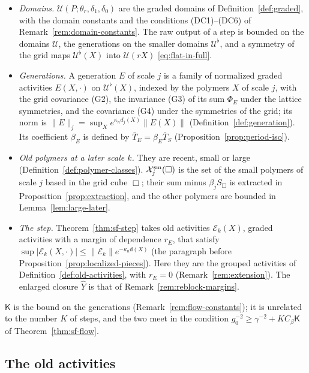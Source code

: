 \begin{readingbox}
\begin{itemize}
\item \emph{Domains.} $\mathcal U(P;\theta_r,\delta_1,\delta_0)$ are the graded domains of Definition~\ref{def:graded}, with the domain constants and the conditions (DC1)--(DC6) of Remark~\ref{rem:domain-constants}. The raw output of a step is bounded on the domains $\mathcal U$, the generations on the smaller domains $\mathcal U^\flat$, and a symmetry of the grid maps $\mathcal U^\flat(X)$ into $\mathcal U(rX)$ \eqref{eq:flat-in-full}.
\item \emph{Generations.} A generation $E$ of scale $j$ is a family of normalized graded activities $E(X,\cdot)$ on $\mathcal U^\flat(X)$, indexed by the polymers $X$ of scale $j$, with the grid covariance (G2), the invariance (G3) of its sum $\Phi_E$ under the lattice symmetries, and the covariance (G4) under the symmetries of the grid; its norm is $\|E\|_j=\sup_Xe^{\kappa_nd_j(X)}\|E(X)\|$ (Definition~\ref{def:generation}). Its coefficient $\beta_E$ is defined by $\bar T_E=\beta_E\bar T_S$ (Proposition~\ref{prop:period-iso}).
\item \emph{Old polymers at a later scale $k$.} They are recent, small or large (Definition~\ref{def:polymer-classes}). $\mathcal X^{\rm sm}_j(\Box)$ is the set of the small polymers of scale $j$ based in the grid cube $\Box$; their sum minus $\beta_jS_\Box$ is extracted in Proposition~\ref{prop:extraction}, and the other polymers are bounded in Lemma~\ref{lem:large-later}.
\item \emph{The step.} Theorem~\ref{thm:sf-step} takes old activities $\mathcal E_k(X)$, graded activities with a margin of dependence $r_E$, that satisfy $\sup|\mathcal E_k(X,\cdot)|\le\|\mathcal E_k\|e^{-\kappa_n\mathsf d(X)}$ (the paragraph before Proposition~\ref{prop:localized-pieces}). Here they are the grouped activities of Definition~\ref{def:old-activities}, with $r_E=0$ (Remark~\ref{rem:extension}). The enlarged closure $\hat Y$ is that of Remark~\ref{rem:reblock-margins}.
\end{itemize}
$\mathsf K$ is the bound on the generations (Remark~\ref{rem:flow-constants}); it is unrelated to the number $K$ of steps, and the two meet in the condition $g_0^{-2}\ge\gamma^{-2}+KC_\beta\mathsf K$ of Theorem~\ref{thm:sf-flow}.
\end{readingbox}

\subsection{The old activities}\label{subsec:flow4-old}

